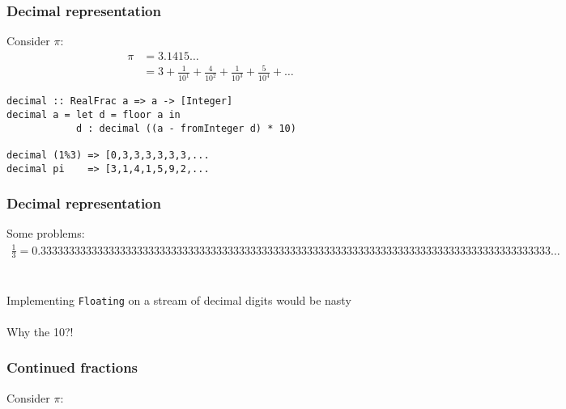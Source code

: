 \documentclass[11pt]{beamer}
\begin{document}
\begin{frame}[fragile]
\frametitle{Decimal representation}
Consider $\pi$:
\begin{align*}
\pi &= 3.1415\dots \\
&= 3 + \frac{1}{10^1} + \frac{4}{10^2} + \frac{1}{10^3} + \frac{5}{10^4} + \dots
\end{align*}

\begin{verbatim}
decimal :: RealFrac a => a -> [Integer]
decimal a = let d = floor a in
            d : decimal ((a - fromInteger d) * 10)

decimal (1%3) => [0,3,3,3,3,3,3,...
decimal pi    => [3,1,4,1,5,9,2,...
\end{verbatim}
\end{frame}

\begin{frame}
\frametitle{Decimal representation}
Some problems:
\begin{align*}
\frac{1}{3} = 0.333333333333333333333333333333333333333333333333333333333333333333333333333333333333333333\dots
\end{align*}
\\~\\
Implementing \texttt{Floating} on a stream of decimal digits
would be nasty
\\~\\
Why the 10?!
\end{frame}

\begin{frame}
\frametitle{Continued fractions}
Consider $\pi$:
\end{frame}
\end{document}
